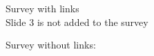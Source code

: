 \documentclass[a4paper]{article}
\begin{document}
\Huge
Survey with links\\
Slide 3 is not added to the survey




\null\vfill\centerline{\scalebox{6}{Slide 1}}\vfill\AddToSurvey\newpage
\null\vfill\centerline{\scalebox{6}{Slide 2}}\vfill\AddToSurvey\newpage
\null\vfill\centerline{\scalebox{6}{Slide 3}}\vfill\newpage
\null\vfill\centerline{\scalebox{6}{Slide 4}}\vfill\AddToSurvey\newpage
\null\vfill\centerline{\scalebox{6}{Slide 5}}\vfill\AddToSurvey\newpage
\null\vfill\centerline{\scalebox{6}{Slide 6}}\vfill\AddToSurvey\newpage

Survey without links:

\end{document}
